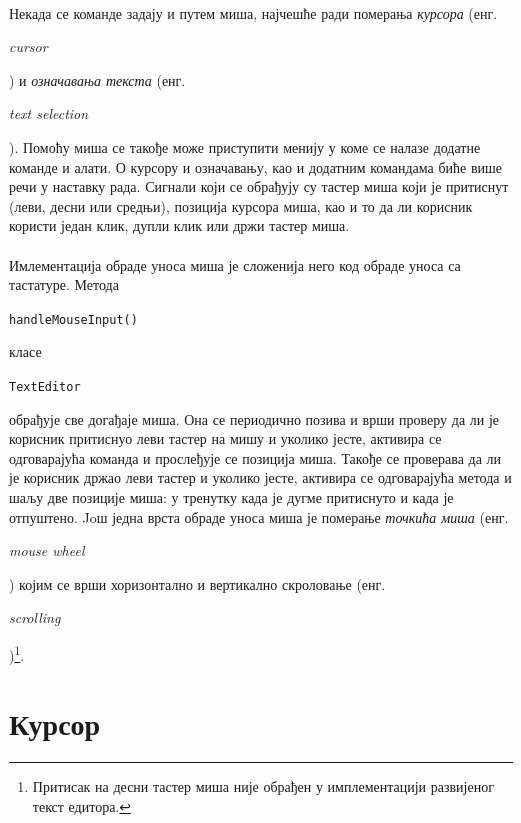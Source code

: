 \documentclass[12pt,oneside]{memoir}
\begin{document}
\paragraph{} 
Некада се команде задају и путем миша, најчешће ради померања \emph{курсора} 
(енг. \begin{latinica}\textit{cursor}\end{latinica}) и \emph{означавања текста}
(енг. \begin{latinica}\textit{text selection}\end{latinica}). Помоћу миша се такође 
може приступити менију у коме се налазе додатне команде и алати.
О курсору и означавању, као и додатним командама биће више речи у наставку рада.
Сигнали који се обрађују су тастер миша који је притиснут (леви, десни или средњи),
позиција курсора миша, као и то да ли корисник користи један клик, дупли клик или
држи тастер миша.

\paragraph{}
Имлементација обраде уноса миша је сложенија него код обраде уноса са тастатуре. Метода
\begin{latinica}\verb|handleMouseInput()|\end{latinica}
класе \begin{latinica}\verb|TextEditor|\end{latinica} обрађује све догађаје
миша. Она се периодично позива и врши проверу да ли је корисник притиснуо леви тастер на 
мишу и уколико јесте, активира се одговарајућа команда и прослеђује се позиција миша. 
Такође се проверава да ли је корисник држао леви тастер и уколико јесте, активира се одговарајућа метода и шаљу две позиције миша: у тренутку када је дугме притиснуто и када је отпуштено. Joш једна врста обраде уноса миша је померање \emph{точкића миша} (енг. \begin{latinica}\textit{mouse wheel}\end{latinica}) којим се врши хоризонтално и вертикално скроловање (енг. \begin{latinica}\textit{scrolling}\end{latinica})\footnote{Притисак на десни тастер миша није обрађен у имплементацији развијеног текст едитора.}.


\section{Курсор} \label{cursor}
\end{document}
